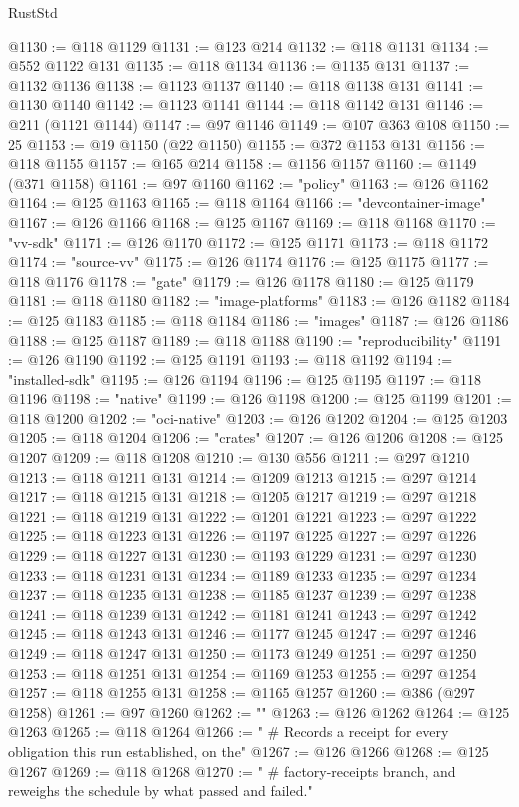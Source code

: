 \begin{lexlean}{RustStd}
\begin{coremodule}
@1130 := @118 @1129
@1131 := @123 @214
@1132 := @118 @1131
@1134 := @552 @1122 @131
@1135 := @118 @1134
@1136 := @1135 @131
@1137 := @1132 @1136
@1138 := @1123 @1137
@1140 := @118 @1138 @131
@1141 := @1130 @1140
@1142 := @1123 @1141
@1144 := @118 @1142 @131
@1146 := @211 (@1121 @1144)
@1147 := @97 @1146
@1149 := @107 @363 @108
@1150 := 25
@1153 := @19 @1150 (@22 @1150)
@1155 := @372 @1153 @131
@1156 := @118 @1155
@1157 := @165 @214
@1158 := @1156 @1157
@1160 := @1149 (@371 @1158)
@1161 := @97 @1160
@1162 := "policy"
@1163 := @126 @1162
@1164 := @125 @1163
@1165 := @118 @1164
@1166 := "devcontainer-image"
@1167 := @126 @1166
@1168 := @125 @1167
@1169 := @118 @1168
@1170 := "vv-sdk"
@1171 := @126 @1170
@1172 := @125 @1171
@1173 := @118 @1172
@1174 := "source-vv"
@1175 := @126 @1174
@1176 := @125 @1175
@1177 := @118 @1176
@1178 := "gate"
@1179 := @126 @1178
@1180 := @125 @1179
@1181 := @118 @1180
@1182 := "image-platforms"
@1183 := @126 @1182
@1184 := @125 @1183
@1185 := @118 @1184
@1186 := "images"
@1187 := @126 @1186
@1188 := @125 @1187
@1189 := @118 @1188
@1190 := "reproducibility"
@1191 := @126 @1190
@1192 := @125 @1191
@1193 := @118 @1192
@1194 := "installed-sdk"
@1195 := @126 @1194
@1196 := @125 @1195
@1197 := @118 @1196
@1198 := "native"
@1199 := @126 @1198
@1200 := @125 @1199
@1201 := @118 @1200
@1202 := "oci-native"
@1203 := @126 @1202
@1204 := @125 @1203
@1205 := @118 @1204
@1206 := "crates"
@1207 := @126 @1206
@1208 := @125 @1207
@1209 := @118 @1208
@1210 := @130 @556
@1211 := @297 @1210
@1213 := @118 @1211 @131
@1214 := @1209 @1213
@1215 := @297 @1214
@1217 := @118 @1215 @131
@1218 := @1205 @1217
@1219 := @297 @1218
@1221 := @118 @1219 @131
@1222 := @1201 @1221
@1223 := @297 @1222
@1225 := @118 @1223 @131
@1226 := @1197 @1225
@1227 := @297 @1226
@1229 := @118 @1227 @131
@1230 := @1193 @1229
@1231 := @297 @1230
@1233 := @118 @1231 @131
@1234 := @1189 @1233
@1235 := @297 @1234
@1237 := @118 @1235 @131
@1238 := @1185 @1237
@1239 := @297 @1238
@1241 := @118 @1239 @131
@1242 := @1181 @1241
@1243 := @297 @1242
@1245 := @118 @1243 @131
@1246 := @1177 @1245
@1247 := @297 @1246
@1249 := @118 @1247 @131
@1250 := @1173 @1249
@1251 := @297 @1250
@1253 := @118 @1251 @131
@1254 := @1169 @1253
@1255 := @297 @1254
@1257 := @118 @1255 @131
@1258 := @1165 @1257
@1260 := @386 (@297 @1258)
@1261 := @97 @1260
@1262 := ""
@1263 := @126 @1262
@1264 := @125 @1263
@1265 := @118 @1264
@1266 := "  # Records a receipt for every obligation this run established, on the"
@1267 := @126 @1266
@1268 := @125 @1267
@1269 := @118 @1268
@1270 := "  # factory-receipts branch, and reweighs the schedule by what passed and failed."

\end{coremodule}
\end{lexlean}
